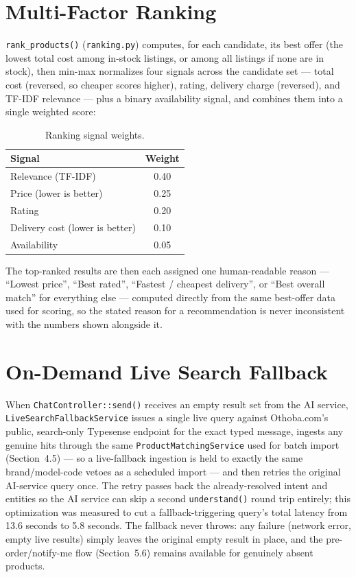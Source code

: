 \documentclass[12pt,a4paper]{report}
\begin{document}
\section{Multi-Factor Ranking}
\texttt{rank\_products()} (\texttt{ranking.py}) computes, for each candidate, its best offer (the lowest
total cost among in-stock listings, or among all listings if none are in stock), then min-max normalizes
four signals across the candidate set --- total cost (reversed, so cheaper scores higher), rating,
delivery charge (reversed), and TF-IDF relevance --- plus a binary availability signal, and combines them
into a single weighted score:

\begin{table}[H]
\centering
\begin{tabular}{lc}
\toprule
\textbf{Signal} & \textbf{Weight} \\
\midrule
Relevance (TF-IDF) & 0.40 \\
Price (lower is better) & 0.25 \\
Rating & 0.20 \\
Delivery cost (lower is better) & 0.10 \\
Availability & 0.05 \\
\bottomrule
\end{tabular}
\caption{Ranking signal weights.}
\end{table}

\noindent The top-ranked results are then each assigned one human-readable reason --- ``Lowest price'',
``Best rated'', ``Fastest / cheapest delivery'', or ``Best overall match'' for everything else --- computed
directly from the same best-offer data used for scoring, so the stated reason for a recommendation is
never inconsistent with the numbers shown alongside it.

\section{On-Demand Live Search Fallback}
When \texttt{ChatController::send()} receives an empty result set from the AI service,
\texttt{LiveSearchFallbackService} issues a single live query against Othoba.com's public, search-only
Typesense endpoint for the exact typed message, ingests any genuine hits through the same
\texttt{ProductMatchingService} used for batch import (Section~4.5) --- so a live-fallback ingestion is
held to exactly the same brand/model-code vetoes as a scheduled import --- and then retries the original
AI-service query once. The retry passes back the already-resolved intent and entities so the AI service
can skip a second \texttt{understand()} round trip entirely; this optimization was measured to cut a
fallback-triggering query's total latency from 13.6 seconds to 5.8 seconds. The fallback never throws: any
failure (network error, empty live results) simply leaves the original empty result in place, and the
pre-order/notify-me flow (Section~5.6) remains available for genuinely absent products.
\end{document}
